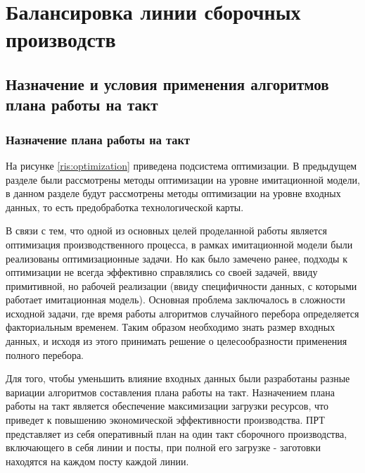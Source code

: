 \chapter{Балансировка линии сборочных производств}

\label{ALBP}


\section{Назначение и условия применения алгоритмов плана работы на такт}
\subsection{Назначение плана работы на такт}
На рисунке \ref{ris:optimization} приведена подсистема оптимизации. В предыдущем разделе были рассмотрены методы оптимизации на уровне имитационной модели, в данном разделе будут рассмотрены методы оптимизации на уровне входных данных, то есть предобработка технологической карты.

В связи с тем, что одной из основных целей проделанной работы является оптимизация производственного процесса, в рамках имитационной модели были реализованы оптимизационные задачи. Но как было замечено ранее, подходы к оптимизации не всегда эффективно справлялись со своей задачей, ввиду примитивной, но рабочей реализации (ввиду специфичности данных, с которыми работает имитационная модель). Основная проблема заключалось в сложности исходной задачи, где время работы алгоритмов случайного перебора определяется факториальным временем. Таким образом необходимо знать размер входных данных, и исходя из этого принимать решение о целесообразности применения полного перебора.

Для того, чтобы уменьшить влияние входных данных были разработаны разные вариации алгоритмов составления плана работы на такт. Назначением плана работы на такт является обеспечение максимизации загрузки ресурсов, что приведет к повышению экономической эффективности производства. ПРТ представляет из себя оперативный план на один такт сборочного производства, включающего в себя линии и посты, при полной его загрузке - заготовки находятся на каждом посту каждой линии.

